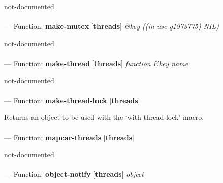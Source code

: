 \begin{adjustwidth}{5em}{5em}
not-documented
\end{adjustwidth}

\paragraph{}
\label{THREADS:MAKE-MUTEX}
--- Function: \textbf{make-mutex} [\textbf{threads}] \textit{\&key ((in-use g1973775) NIL)}

\begin{adjustwidth}{5em}{5em}
not-documented
\end{adjustwidth}

\paragraph{}
\label{THREADS:MAKE-THREAD}
--- Function: \textbf{make-thread} [\textbf{threads}] \textit{function \&key name}

\begin{adjustwidth}{5em}{5em}
not-documented
\end{adjustwidth}

\paragraph{}
\label{THREADS:MAKE-THREAD-LOCK}
--- Function: \textbf{make-thread-lock} [\textbf{threads}] \textit{}

\begin{adjustwidth}{5em}{5em}
Returns an object to be used with the `with-thread-lock' macro.
\end{adjustwidth}

\paragraph{}
\label{THREADS:MAPCAR-THREADS}
--- Function: \textbf{mapcar-threads} [\textbf{threads}] \textit{}

\begin{adjustwidth}{5em}{5em}
not-documented
\end{adjustwidth}

\paragraph{}
\label{THREADS:OBJECT-NOTIFY}
--- Function: \textbf{object-notify} [\textbf{threads}] \textit{object}

